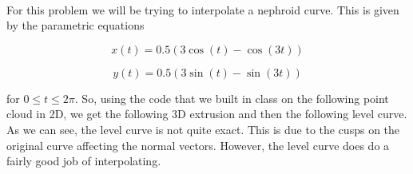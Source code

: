 \begin{solution}\renewcommand{\qedsymbol}{}\ \\
    For this problem we will be trying to interpolate a nephroid curve. This is given by the parametric
    equations

    $$x(t) = 0.5(3\cos(t)-\cos(3t))$$

    $$y(t) = 0.5(3\sin(t)-\sin(3t))$$

    for $0\leq t\leq2\pi$. So, using the code that we built in class on the following point cloud in 2D,
    we get the following 3D extrusion and then the following level curve. As we can see, the level curve
    is not quite exact. This is due to the cusps on the original curve affecting the normal vectors.
    However, the level curve does do a fairly good job of interpolating.
    
    \begin{center}


\end{center}
\end{solution}

